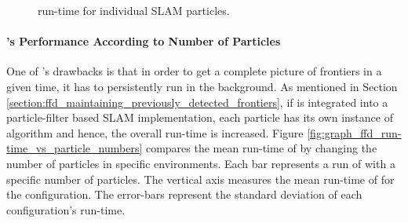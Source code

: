 \begin{figure}[htp]
{ \label{fig:graph_particle_times_mit-csail}}
 \caption{\FFD run-time for individual SLAM particles.}
 \label{fig:graph_particle_times}
\end{figure}

\paragraph{\FFD's Performance According to Number of Particles}
One of \FFD's drawbacks is that in order to get a complete picture of frontiers
in a given time, it has to persistently run in the background. As mentioned in
Section \ref{section:ffd_maintaining_previously_detected_frontiers}, if \FFD is
integrated into a particle-filter based SLAM implementation, each particle has
its own instance of \FFD algorithm and hence, the overall run-time is increased.
Figure \ref{fig:graph_ffd_run-time_vs_particle_numbers} compares the mean
run-time of \FFD by changing the number of particles in specific
environments.
Each bar represents a run of \FFD with a specific number of particles. The
vertical axis measures the mean run-time of \FFD for the configuration.
The error-bars represent the standard deviation of each configuration's
run-time.


